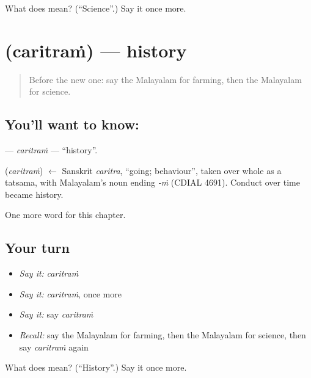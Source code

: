 \begin{tcolorbox}[breakable,colback=teal!4,colframe=teal!35!black,title={Before you move on}]
What does  mean? (\textquotedblleft{}Science\textquotedblright{}.) Say it once more.
\end{tcolorbox}
\section[\texorpdfstring{\ml{ചരിത്രം} (caritraṁ)}{ചരിത്രം (caritraṁ)}]{ (caritraṁ) — history}

\label{lesson:ML-C336-caritram}



\begin{quote}
Before the new one: say the Malayalam for farming, then the Malayalam for science.
\end{quote}

\subsection*{You'll want to know: }
\textbf{} — \emph{caritraṁ} — \textquotedblleft{}history\textquotedblright{}.

\begin{cousinweb}
\textbf{} (\emph{caritraṁ}) $\leftarrow$ Sanskrit \emph{caritra}, \textquotedblleft{}going; behaviour\textquotedblright{}, taken over whole as a tatsama, with Malayalam's noun ending \emph{-ṁ} (CDIAL 4691). Conduct over time became history.
\end{cousinweb}

\begin{grammarlens}[title={What you've built}]
One more word for this chapter.
\end{grammarlens}

\subsection*{Your turn}
\begin{itemize}
\raggedright
  \item \emph{Say it:} \emph{caritraṁ}
  \item \emph{Say it:} \emph{caritraṁ}, once more
  \item \emph{Say it:} say \emph{caritraṁ}
  \item \emph{Recall:} say the Malayalam for farming, then the Malayalam for science, then say \emph{caritraṁ} again
\end{itemize}

\begin{tcolorbox}[breakable,colback=teal!4,colframe=teal!35!black,title={Before you move on}]
What does  mean? (\textquotedblleft{}History\textquotedblright{}.) Say it once more.
\end{tcolorbox}
